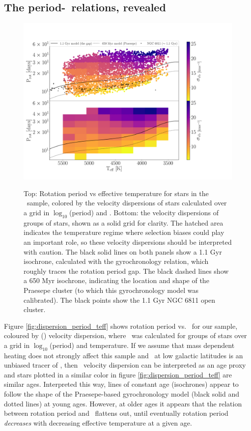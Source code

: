 \subsection{The period-\teff\ relations, revealed}
\label{sec:the_reveal}

\begin{figure}
  \caption{
      Top: Rotation period vs effective temperature for stars in the \mct\
    sample, colored by the velocity dispersions of stars calculated over a
    grid in $\log_{10}$(period) and \teff.
    Bottom: the velocity dispersions of groups of stars, shown as a solid
    grid for clarity.
    The hatched area indicates the temperature regime where selection biases
    could play an important role, so these velocity dispersions should be
    interpreted with caution.
    The black solid lines on both panels show a 1.1 Gyr isochrone, calculated
    with the \citet{angus2019} gyrochronology relation, which roughly traces
    the rotation period gap.
    The black dashed lines show a 650 Myr isochrone, indicating the location
    and shape of the Praesepe cluster (to which this gyrochronology model was
    calibrated).
    The black points show the 1.1 Gyr NGC 6811 open cluster.
}
  \centering
    \includegraphics[width=1\textwidth]{vplot}
\label{fig:vplot}
\end{figure}
Figure \ref{fig:dispersion_period_teff} shows rotation period vs. \teff\ for
our sample, coloured by (\vb) velocity dispersion, where \sigmavb\ was
calculated for groups of stars over a grid in $\log_{10}$(period) and
temperature.
If we assume that mass dependent heating does not strongly affect this sample
and \vb\ at low galactic latitudes is an unbiased tracer of \vz, then \vb\
velocity dispersion can be interpreted as an age proxy and stars plotted in a
similar color in figure \ref{fig:dispersion_period_teff} are similar ages.
Interpreted this way, lines of constant age (isochrones) appear to follow the
shape of the Praesepe-based gyrochronology model (black solid and dotted
lines) at young ages.
However, at older ages it appears that the relation between rotation period
and \teff\ flattens out, until eventually rotation period {\it decreases} with
decreasing effective temperature at a given age.

